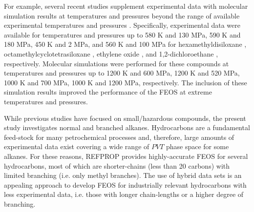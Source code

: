 \documentclass[preprint,letterpaper,floatfix,citeautoscript,aip,jcp]{revtex4-1}
\begin{document}
For example, several recent studies supplement experimental data with molecular simulation results at temperatures and pressures beyond the range of available experimental temperatures and pressures \cite{Thol2016_siloxane_first,Thol2016_siloxane,Thol2017,Thol2015}. Specifically, experimental data were available for temperatures and pressures up to 580 K and 130 MPa, 590 K and 180 MPa, 450 K and 2 MPa, and 560 K and 100 MPa for hexamethyldisiloxane \cite{Thol2016_siloxane_first}, octamethylcyclotetrasiloxane \cite{Thol2016_siloxane}, ethylene oxide \cite{Thol2015}, and 1,2-dichloroethane \cite{Thol2017}, respectively. Molecular simulations were performed for these compounds at temperatures and pressures up to 1200 K and 600 MPa, 1200 K and 520 MPa, 1000 K and 700 MPa, 1000 K and 1200 MPa, respectively. The inclusion of these simulation results improved the performance of the FEOS at extreme temperatures and pressures. 

% 

While previous studies have focused on small/hazardous compounds, the present study investigates normal and branched alkanes. Hydrocarbons are a fundamental feed-stock for many petrochemical processes and, therefore, large amounts of experimental data exist covering a wide range of $PVT$ phase space for some alkanes. For these reasons, REFPROP provides highly-accurate FEOS for several hydrocarbons, most of which are shorter-chains (less than 20 carbons) with limited branching (i.e. only methyl branches). The use of hybrid data sets is an appealing approach to develop FEOS for industrially relevant hydrocarbons with less experimental data, i.e. those with longer chain-lengths or a higher degree of branching.


\end{document}

